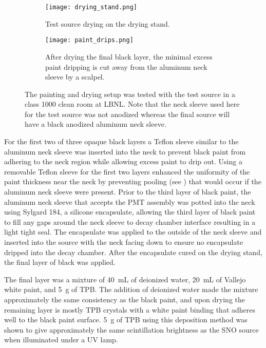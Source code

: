 \begin{figure}
\begin{subfigure}{.28\textwidth}
  \texttt{[image: drying\_stand.png]}
  \caption{Test source drying on the drying stand.}
\end{subfigure}
\hspace{0.5cm}
\begin{subfigure}{.67\textwidth}
  \texttt{[image: paint\_drips.png]}
  \caption{After drying the final black layer, the minimal excess paint dripping is cut away from the aluminum neck sleeve by a scalpel.}
\end{subfigure}
\caption{The painting and drying setup was tested with the test source in a class 1000 clean room at LBNL. Note that the neck sleeve used here for the test source was not anodized whereas the final source will have a black anodized aluminum neck sleeve.}
\label{fig:drying}
\end{figure}


For the first two of three opaque black layers a Teflon sleeve similar to the aluminum neck sleeve was inserted into the neck to prevent black paint from adhering to the neck region while allowing excess paint to drip out. Using a removable Teflon sleeve for the first two layers enhanced the uniformity of the paint thickness near the neck by preventing pooling (see ) that would occur if the aluminum neck sleeve were present. Prior to the third layer of black paint, the aluminum neck sleeve that accepts the PMT assembly was potted into the neck using Sylgard 184, a silicone encapsulate, allowing the third layer of black paint to fill any gaps around the neck sleeve to decay chamber interface resulting in a light tight seal. The encapsulate was applied to the outside of the neck sleeve and inserted into the source with the neck facing down to ensure no encapsulate dripped into the decay chamber. After the encapsulate cured on the drying stand, the final layer of black was applied.

The final layer was a mixture of 40~mL of deionized water, 20~mL of Vallejo white paint, and 5~g of TPB. The addition of deionized water made the mixture approximately the same consistency as the black paint, and upon drying the remaining layer is mostly TPB crystals with a white paint binding that adheres well to the black paint surface. 5~g of TPB using this deposition method was shown to give approximately the same scintillation brightness as the SNO \Li source when illuminated under a UV lamp.

